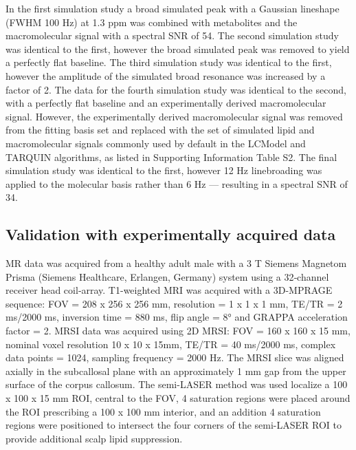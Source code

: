 \documentclass[num-refs]{wiley-article}
\begin{document}
In the first simulation study a broad simulated peak with a Gaussian lineshape (FWHM 100 Hz) at 1.3 ppm was combined with metabolites and the macromolecular signal with a spectral SNR of 54. The second simulation study was identical to the first, however the broad simulated peak was removed to yield a perfectly flat baseline. The third simulation study was identical to the first, however the amplitude of the simulated broad resonance was increased by a factor of 2. The data for the fourth simulation study was identical to the second, with a perfectly flat baseline and an experimentally derived macromolecular signal. However, the experimentally derived macromolecular signal was removed from the fitting basis set and replaced with the set of simulated lipid and macromolecular signals commonly used by default in the LCModel and TARQUIN algorithms, as listed in Supporting Information Table S2. The final simulation study was identical to the first, however 12 Hz linebroading was applied to the molecular basis rather than 6 Hz --- resulting in a spectral SNR of 34.

\subsection{Validation with experimentally acquired data}

MR data was acquired from a healthy adult male with a 3 T Siemens Magnetom Prisma (Siemens Healthcare, Erlangen, Germany) system using a 32‐channel receiver head coil‐array. T1-weighted MRI was acquired with a 3D-MPRAGE sequence: FOV = 208 x 256 x 256 mm, resolution = 1 x 1 x 1 mm, TE/TR = 2 ms/2000 ms, inversion time = 880 ms, flip angle = \ang{8} and GRAPPA acceleration factor = 2. MRSI data was acquired using 2D MRSI: FOV = 160 x 160 x 15 mm, nominal voxel resolution 10 x 10 x 15mm, TE/TR = 40 ms/2000 ms, complex data points = 1024, sampling frequency = 2000 Hz. The MRSI slice was aligned axially in the subcallosal plane with an approximately 1 mm gap from the upper surface of the corpus callosum. The semi-LASER method \cite{Scheenen2008} was used localize a 100 x 100 x 15 mm ROI, central to the FOV, 4 saturation regions were placed around the ROI prescribing a 100 x 100 mm interior, and an addition 4 saturation regions were positioned to intersect the four corners of the semi-LASER ROI to provide additional scalp lipid suppression.
\end{document}
